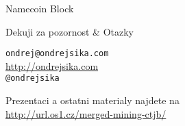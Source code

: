 \documentclass{beamer}
\begin{document}
\begin{frame}

    {\Huge Namecoin Block}\\

\end{frame}

\begin{frame}

    {\Huge Dekuji za pozornost \& Otazky}\\

    \vspace{1cm}

    \texttt{ondrej@ondrejsika.com}\\
    \url{http://ondrejsika.com}\\
    \texttt{@ondrejsika}\\

    \vspace{1cm}

    Prezentaci a ostatni materialy najdete na\\
    \url{http://url.os1.cz/merged-mining-ctjb/}
\end{frame}
\end{document}
